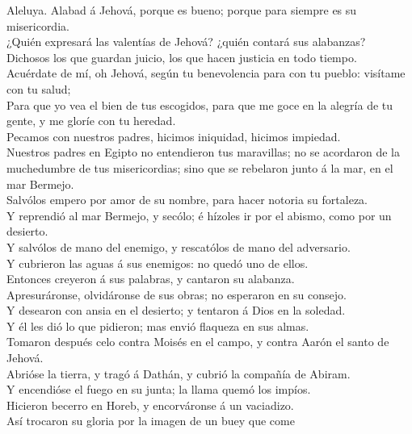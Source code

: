  Aleluya. Alabad á Jehová, porque es bueno; porque para
siempre es su misericordia.\\
 ¿Quién expresará las valentías de Jehová? ¿quién contará
sus alabanzas?\\
 Dichosos los que guardan juicio, los que hacen justicia en
todo tiempo.\\
 Acuérdate de mí, oh Jehová, según tu benevolencia para con
tu pueblo: visítame con tu salud;\\
 Para que yo vea el bien de tus escogidos, para que me goce
en la alegría de tu gente, y me gloríe con tu heredad.\\
 Pecamos con nuestros padres, hicimos iniquidad, hicimos
impiedad.\\
 Nuestros padres en Egipto no entendieron tus maravillas; no
se acordaron de la muchedumbre de tus misericordias; sino que se
rebelaron junto á la mar, en el mar Bermejo.\\
 Salvólos empero por amor de su nombre, para hacer notoria
su fortaleza.\\
 Y reprendió al mar Bermejo, y secólo; é hízoles ir por el
abismo, como por un desierto.\\
 Y salvólos de mano del enemigo, y rescatólos de mano del
adversario.\\
 Y cubrieron las aguas á sus enemigos: no quedó uno de
ellos.\\
 Entonces creyeron á sus palabras, y cantaron su
alabanza.\\
 Apresuráronse, olvidáronse de sus obras; no esperaron en
su consejo.\\
 Y desearon con ansia en el desierto; y tentaron á Dios en
la soledad.\\
 Y él les dió lo que pidieron; mas envió flaqueza en sus
almas.\\
 Tomaron después celo contra Moisés en el campo, y contra
Aarón el santo de Jehová.\\
 Abrióse la tierra, y tragó á Dathán, y cubrió la compañía
de Abiram.\\
 Y encendióse el fuego en su junta; la llama quemó los
impíos.\\
 Hicieron becerro en Horeb, y encorváronse á un
vaciadizo.\\
 Así trocaron su gloria por la imagen de un buey que come
